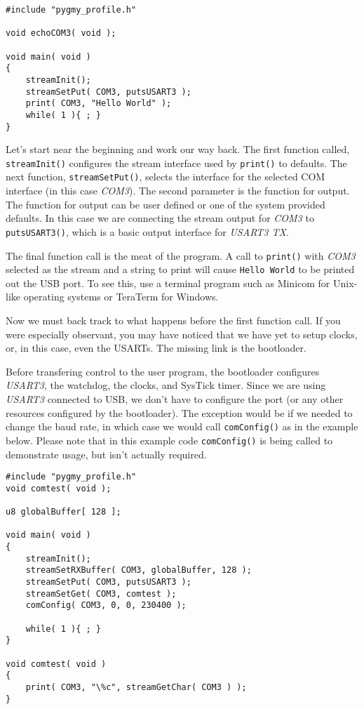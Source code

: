 \documentclass{article}
\begin{document}
\begin{verbatim}
#include "pygmy_profile.h"

void echoCOM3( void );

void main( void )
{
	streamInit();
	streamSetPut( COM3, putsUSART3 );
	print( COM3, "Hello World" );
	while( 1 ){ ; }
}
\end{verbatim}

Let's start near the beginning and work our way back. The first function called, \verb|streamInit()| configures the stream interface used by \verb|print()| to defaults. The next function, \verb|streamSetPut()|, selects the interface for the selected COM interface (in this case \emph{COM3}). The second parameter is the function for output. The function for output can be user defined or one of the system provided defaults. In this case we are connecting the stream output for \emph{COM3} to \verb|putsUSART3()|, which is a basic output interface for \emph{USART3 TX}.

The final function call is the meat of the program. A call to \verb|print()| with \emph{COM3} selected as the stream and a string to print will cause \verb|Hello World| to be printed out the USB port. To see this, use a terminal program such as Minicom for Unix-like operating systems or TeraTerm for Windows\textsuperscript{\textregistered}.

Now we must back track to what happens before the first function call. If you were especially observant, you may have noticed that we have yet to setup clocks, or, in this case, even the USARTs. The missing link is the bootloader.

Before transfering control to the user program, the bootloader configures \emph{USART3}, the watchdog, the clocks, and SysTick timer. Since we are using \emph{USART3} connected to USB, we don't have to configure the port (or any other resources configured by the bootloader). The exception would be if we needed to change the baud rate, in which case we would call \verb|comConfig()| as in the example below. Please note that in this example code \verb|comConfig()| is being called to demonstrate usage, but isn't actually required.

\begin{lstlisting}
#include "pygmy_profile.h"
void comtest( void );

u8 globalBuffer[ 128 ];

void main( void )
{
	streamInit();
	streamSetRXBuffer( COM3, globalBuffer, 128 );
	streamSetPut( COM3, putsUSART3 );
	streamSetGet( COM3, comtest );
	comConfig( COM3, 0, 0, 230400 );

	while( 1 ){ ; }
}

void comtest( void )
{
	print( COM3, "\%c", streamGetChar( COM3 ) );
}
\end{lstlisting}
\end{document}
